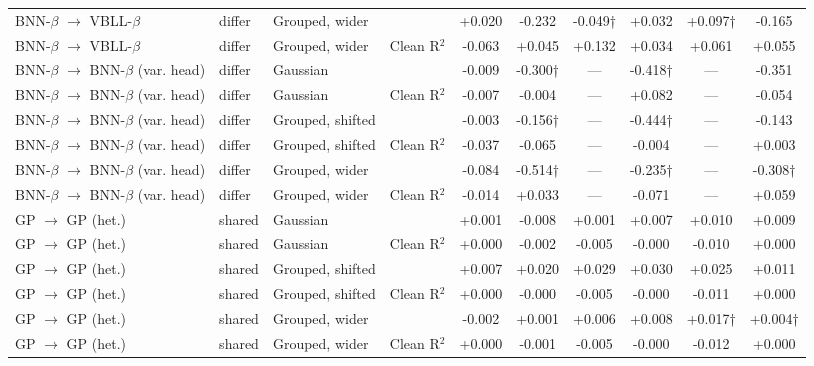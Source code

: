 \begin{landscape}
{\begin{longtable}{llllcccccc}
BNN-$\beta$ $\rightarrow$ VBLL-$\beta$ & differ & Grouped, wider & \aucnorm{} & +0.020 & -0.232 & -0.049† & +0.032 & +0.097† & -0.165 \\
BNN-$\beta$ $\rightarrow$ VBLL-$\beta$ & differ & Grouped, wider & Clean R$^2$ & -0.063 & +0.045 & +0.132 & +0.034 & +0.061 & +0.055 \\
BNN-$\beta$ $\rightarrow$ BNN-$\beta$ (var. head) & differ & Gaussian & \aucnorm{} & -0.009 & -0.300† & --- & -0.418† & --- & -0.351 \\
BNN-$\beta$ $\rightarrow$ BNN-$\beta$ (var. head) & differ & Gaussian & Clean R$^2$ & -0.007 & -0.004 & --- & +0.082 & --- & -0.054 \\
BNN-$\beta$ $\rightarrow$ BNN-$\beta$ (var. head) & differ & Grouped, shifted & \aucnorm{} & -0.003 & -0.156† & --- & -0.444† & --- & -0.143 \\
BNN-$\beta$ $\rightarrow$ BNN-$\beta$ (var. head) & differ & Grouped, shifted & Clean R$^2$ & -0.037 & -0.065 & --- & -0.004 & --- & +0.003 \\
BNN-$\beta$ $\rightarrow$ BNN-$\beta$ (var. head) & differ & Grouped, wider & \aucnorm{} & -0.084 & -0.514† & --- & -0.235† & --- & -0.308† \\
BNN-$\beta$ $\rightarrow$ BNN-$\beta$ (var. head) & differ & Grouped, wider & Clean R$^2$ & -0.014 & +0.033 & --- & -0.071 & --- & +0.059 \\
GP $\rightarrow$ GP (het.) & shared & Gaussian & \aucnorm{} & +0.001 & -0.008 & +0.001 & +0.007 & +0.010 & +0.009 \\
GP $\rightarrow$ GP (het.) & shared & Gaussian & Clean R$^2$ & +0.000 & -0.002 & -0.005 & -0.000 & -0.010 & +0.000 \\
GP $\rightarrow$ GP (het.) & shared & Grouped, shifted & \aucnorm{} & +0.007 & +0.020 & +0.029 & +0.030 & +0.025 & +0.011 \\
GP $\rightarrow$ GP (het.) & shared & Grouped, shifted & Clean R$^2$ & +0.000 & -0.000 & -0.005 & -0.000 & -0.011 & +0.000 \\
GP $\rightarrow$ GP (het.) & shared & Grouped, wider & \aucnorm{} & -0.002 & +0.001 & +0.006 & +0.008 & +0.017† & +0.004† \\
GP $\rightarrow$ GP (het.) & shared & Grouped, wider & Clean R$^2$ & +0.000 & -0.001 & -0.005 & -0.000 & -0.012 & +0.000 \\
\bottomrule
\end{longtable}}
\end{landscape}

